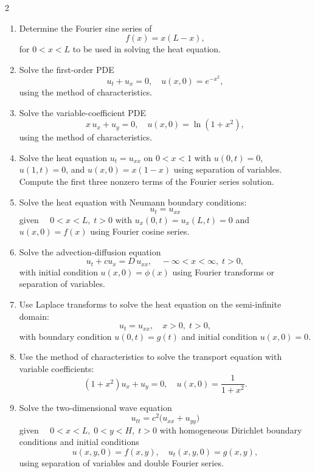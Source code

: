 \begin{multicols}{2}
\begin{enumerate}
  \item Determine the Fourier sine series of
    \[
    f(x)=x(L-x),
    \]
    for \(0<x<L\) to be used in solving the heat equation.

  \item Solve the first-order PDE
    \[
    u_t+u_x=0,\quad u(x,0)=e^{-x^2},
    \]
    using the method of characteristics.

  \item Solve the variable-coefficient PDE
    \[
    x\,u_x+u_y=0,\quad u(x,0)=\ln(1+x^2),
    \]
    using the method of characteristics.

  \item Solve the heat equation $u_t = u_{xx}$ on $0 < x < 1$ with $u(0,t) = 0$, $u(1,t) = 0$, and $u(x,0) = x(1-x)$ using separation of variables. Compute the first three nonzero terms of the Fourier series solution.

  \item Solve the heat equation with Neumann boundary conditions:
    \[
    u_t=u_{xx}
    \]
    given $\quad 0<x<L,\;t>0 $ with \(u_x(0,t)=u_x(L,t)=0\) and \(u(x,0)=f(x)\) using Fourier cosine series.

  \item Solve the advection-diffusion equation
    \[
    u_t+cu_x=D\,u_{xx},\quad -\infty<x<\infty,\;t>0,
    \]
    with initial condition \(u(x,0)=\phi(x)\) using Fourier transforms or separation of variables.

  \item Use Laplace transforms to solve the heat equation on the semi-infinite domain:
    \[
    u_t=u_{xx},\quad x>0,\;t>0,
    \]
    with boundary condition \(u(0,t)=g(t)\) and initial condition \(u(x,0)=0\).

  \item Use the method of characteristics to solve the transport equation with variable coefficients:
    \[
    (1+x^2)u_x+u_y=0,\quad u(x,0)=\frac{1}{1+x^2}.
    \]

  \item Solve the two-dimensional wave equation
    \[
    u_{tt}=c^2\bigl(u_{xx}+u_{yy}\bigr)
    \]
    given $\quad 0<x<L,\;0<y<H,\;t>0$ with homogeneous Dirichlet boundary conditions and initial conditions
    \[
    u(x,y,0)=f(x,y),\quad u_t(x,y,0)=g(x,y),
    \]
    using separation of variables and double Fourier series.

\end{enumerate}

\end{multicols}


